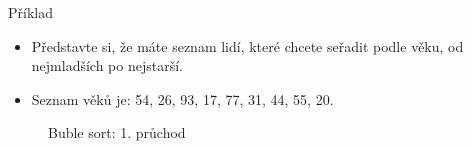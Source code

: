 \documentclass[11pt]{beamer}
\begin{document}
\begin{frame}{Příklad}
    \begin{itemize}
        \item Představte si, že máte seznam lidí, které chcete seřadit podle věku, od nejmladších po nejstarší.
        \item Seznam věků je: 54, 26, 93, 17, 77, 31, 44, 55, 20.
    \end{itemize}
    \begin{figure}
        \centering
        \caption{Buble sort: 1. průchod}
        \label{fig:Buble_Sort_Example}
    \end{figure}
\end{frame}
\end{document}
